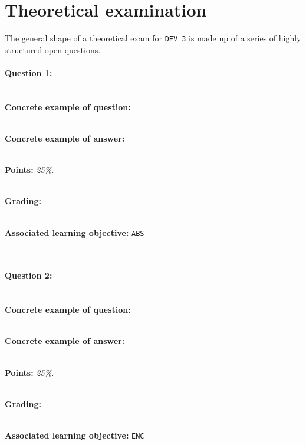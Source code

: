 \section*{Theoretical examination \modulecode}
The general shape of a theoretical exam for \texttt{DEV 3} is made up of a series of highly structured open questions.

\paragraph{Question 1: } \ \\

\textbf{Concrete example of question:} \textit{}

\ \\ 

\textbf{Concrete example of answer:} \textit{}

\ \\

\textbf{Points:} \textit{25\%.}

\ \\ 

\textbf{Grading:} \textit{}

\ \\ 

\textbf{Associated learning objective:} \texttt{ABS}

\ \\ 

\paragraph{Question 2: } \ \\

\textbf{Concrete example of question:} \textit{}

\ \\

\textbf{Concrete example of answer:} \textit{}

\ \\

\textbf{Points:} \textit{25\%.}

\ \\

\textbf{Grading:} \textit{}

\ \\

\textbf{Associated learning objective:} \texttt{ENC}

\ \\

